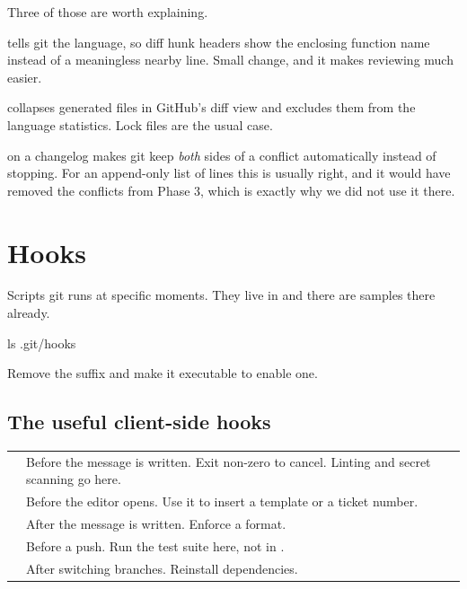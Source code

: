 \documentclass[11pt]{article}
\begin{document}
Three of those are worth explaining.

 tells git the language, so diff hunk headers show the enclosing
function name instead of a meaningless nearby line. Small change, and it makes
reviewing much easier.

 collapses generated files in GitHub's diff view and
excludes them from the language statistics. Lock files are the usual case.

 on a changelog makes git keep \emph{both} sides of a conflict
automatically instead of stopping. For an append-only list of lines this is usually
right, and it would have removed the conflicts from Phase 3, which is exactly why we
did not use it there.

\section{Hooks}

Scripts git runs at specific moments. They live in  and there are
samples there already.

\begin{shell}
ls .git/hooks
\end{shell}

Remove the  suffix and make it executable to enable one.

\subsection{The useful client-side hooks}

\vspace{0.5em}
\begin{tabularx}{\linewidth}{@{}L{3.4cm} X@{}}
\toprule
{} &  \\
\midrule
{} & Before the message is written. Exit non-zero to cancel. Linting
and secret scanning go here. \\
 & Before the editor opens. Use it to insert a template or a
ticket number. \\
 & After the message is written. Enforce a format. \\
 & Before a push. Run the test suite here, not in . \\
 & After switching branches. Reinstall dependencies. \\
\bottomrule
\end{tabularx}
\vspace{0.5em}
\end{document}
